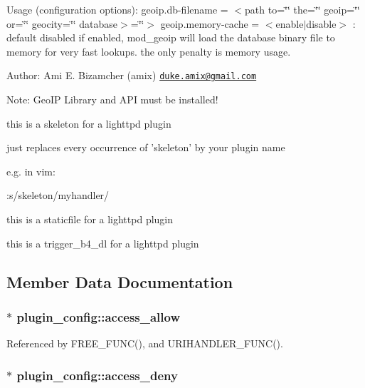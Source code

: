Usage (configuration options)\-: geoip.\-db-\/filename = $<$path to=\char`\"{}\char`\"{} the=\char`\"{}\char`\"{} geoip=\char`\"{}\char`\"{} or=\char`\"{}\char`\"{} geocity=\char`\"{}\char`\"{} database$>$=\char`\"{}\char`\"{}$>$ geoip.\-memory-\/cache = $<$enable$\vert$disable$>$ \-: default disabled if enabled, mod\-\_\-geoip will load the database binary file to memory for very fast lookups. the only penalty is memory usage.

Author\-: Ami E. Bizamcher (amix) \href{mailto:duke.amix@gmail.com}{\tt duke.\-amix@gmail.\-com}

Note\-: Geo\-I\-P Library and A\-P\-I must be installed!

this is a skeleton for a lighttpd plugin

just replaces every occurrence of 'skeleton' by your plugin name

e.\-g. in vim\-:

\-:s/skeleton/myhandler/

this is a staticfile for a lighttpd plugin

this is a trigger\-\_\-b4\-\_\-dl for a lighttpd plugin 

\subsection{Member Data Documentation}
\hypertarget{structplugin__config_add01c632c0451007ebaf856a283e8617}{
\subsubsection[{access\-\_\-allow}]{$\ast$ plugin\-\_\-config\-::access\-\_\-allow}}\label{structplugin__config_add01c632c0451007ebaf856a283e8617}


Referenced by F\-R\-E\-E\-\_\-\-F\-U\-N\-C(), and U\-R\-I\-H\-A\-N\-D\-L\-E\-R\-\_\-\-F\-U\-N\-C().

\hypertarget{structplugin__config_af503027bbb7fb2345bf6ac966a3f94d4}{
\subsubsection[{access\-\_\-deny}]{$\ast$ plugin\-\_\-config\-::access\-\_\-deny}}\label{structplugin__config_af503027bbb7fb2345bf6ac966a3f94d4}


